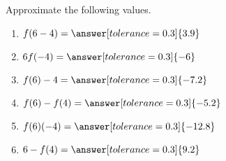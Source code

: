 \documentclass{ximera}
\begin{document}
\begin{exercise}
\begin{question}
\end{question}









\begin{question}  Approximate the following values. \\

\begin{enumerate}
  \item $f(6 - 4) = \answer[tolerance=0.3]{3.9}$ 
  \item $6 f(-4) = \answer[tolerance=0.3]{-6}$ 
  \item $f(6) - 4 =  \answer[tolerance=0.3]{-7.2}$
  \item $f(6) - f(4) =  \answer[tolerance=0.3]{-5.2}$
  \item $f(6)(-4) =  \answer[tolerance=0.3]{-12.8}$
  \item $6 - f(4) =  \answer[tolerance=0.3]{9.2}$
\end{enumerate}

\end{question}









\end{exercise}
\end{document}
